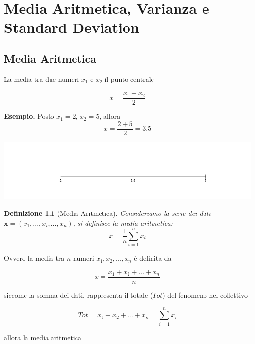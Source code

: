 \documentclass[
  11pt,
]{book}
\theoremstyle{mytheoremstyle}
\theoremstyle{mydefstyle}
\newtheorem{definition}{Definizione}[section]
\begin{document}
\normalsize

\chapter{Media Aritmetica, Varianza e Standard Deviation}\label{media-aritmetica-varianza-e-standard-deviation}

\section{Media Aritmetica}\label{media}

La media tra due numeri \(x_1\) e \(x_2\) il punto centrale

\[\bar x = \frac{x_1+x_2}{2}\]

\textbf{Esempio.} Posto \(x_1=2\), \(x_2=5\), allora
\[\bar x =\frac{2+5}{2}=3.5\]

\begin{center}

\begin{center}\includegraphics{Appunti_di_Statistica_2025_files/figure-latex/03-media-varianza-2,-1} \end{center}

\end{center}

\begin{info}

\begin{definition}[Media Aritmetica]
Consideriamo la serie dei dati \(\mathbf{x}=(x_1,...,x_i,...,x_n)\), si definisce la media aritmetica:
\[
\bar x =\frac 1 n \sum_{i=1}^nx_i 
\]
\end{definition}

\end{info}

Ovvero la media tra \(n\) numeri \(x_1, x_2,...,x_n\) è definita da

\[\bar x = \frac{x_1+x_2+...+x_n}{n}\]

siccome la somma dei dati, rappresenta il totale (\(Tot\)) del fenomeno nel collettivo

\[Tot=x_1+x_2+...+x_n=\sum_{i=1}^nx_i \]

allora la media aritmetica
\end{document}
